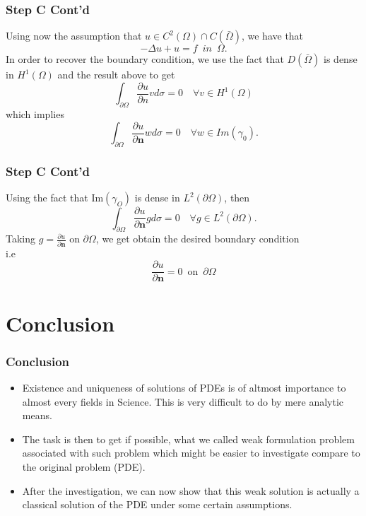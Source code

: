 \documentclass[7pt]{beamer}
\newcommand{\Om}{\Omega}
\begin{document}
\begin{frame}
 \frametitle{Step C Cont'd}
Using now the assumption that $u\in C^2(\Om)\cap C(\bar\Om)$, we have that $$-\Delta u + u = f \,\,\,in \,\,\,\Om.$$ \label{bondss}
In order to recover the boundary condition, we use the fact that $D(\bar\Om)$ is dense in $H^1(\Om)$ and the result above to get
$$\int_{\partial\Om}{\frac{\partial u}{\partial n}} vd\sigma = 0 \,\,\,\,\,\, \forall v\in H^1(\Om)$$
which implies $$\int_{\partial\Om}{\frac{\partial u}{\partial \textbf{n}}} wd\sigma = 0 \,\,\,\,\,\, \forall w\in Im(\gamma_0).$$
\end{frame}

\begin{frame}
 \frametitle{Step C Cont'd}
Using the fact that Im$(\gamma_O)$ is dense in $L^2(\partial\Om)$, then
$$\int_{\partial\Om}{\frac{\partial u}{\partial \textbf{n}}} gd\sigma = 0 \,\,\,\,\,\, \forall g\in L^2(\partial\Om).$$
Taking $g = \frac{\partial u}{\partial \textbf{n}}$ on $\partial\Om$, we get obtain the desired boundary condition\\
i.e $$\frac{\partial u}{\partial \textbf{n}}= 0 \,\,\,\text{on}\,\,\, \partial\Om$$
\end{frame}
\section{Conclusion}
\begin{frame}
\frametitle{Conclusion}
\begin{itemize}
\item Existence and uniqueness of solutions of PDEs is of altmost importance to almost every fields in Science. This is very difficult to do by mere analytic means.
\item The task is then to get if possible, what we called weak formulation problem associated with such problem which might be easier to investigate compare to the original problem (PDE).
\item After the investigation, we can now show that this weak solution is actually a classical solution of the PDE under some certain assumptions.
\end{itemize}
\end{frame}
\end{document}
